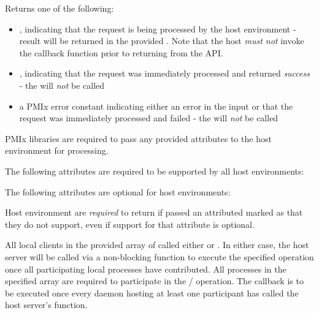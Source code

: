 Returns one of the following:

\begin{itemize}
    \item {}, indicating that the request is being processed by the host environment - result will be returned in the provided . Note that the host \emph{must not} invoke the callback function prior to returning from the \ac{API}.
    \item {}, indicating that the request was immediately processed and returned \textit{success} - the  will \textit{not} be called
    \item a PMIx error constant indicating either an error in the input or that the request was immediately processed and failed - the  will \textit{not} be called
\end{itemize}

\reqattrstart
\ac{PMIx} libraries are required to pass any provided attributes to the host environment for processing.

\divider

The following attributes are required to be supported by all host environments:


\reqattrend

\optattrstart
The following attributes are optional for host environments:


\optattrend

\advicermstart
Host environment are \textit{required} to return  if passed an attributed marked as  that they do not support, even if support for that attribute is optional.
\advicermend

\descr

All local clients in the provided array of  called either  or .
In either case, the host server will be called via a non-blocking function to execute the specified operation once all participating local processes have contributed.
All processes in the specified  array are required to participate in the / operation.
The callback is to be executed once every daemon hosting at least one participant has called the host server's  function.

